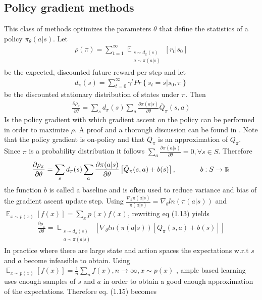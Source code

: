 \subsection{Policy gradient methods}

This class of methods optimizes the parameters $\theta$ that define the statistics of a policy $\pi_\theta(a|s)$. Let 
\begin{align}
\rho(\pi) = \sum_{t=1}^{\infty}\mathop{\mathbb{E}}_{\substack{s\sim d_\pi(s) \\ a\sim \pi(a|s)}} \left[ r_t|s_0 \right]
\end{align}
be the expected, discounted future reward per step and let
\begin{align}
d_\pi(s) = \sum_{t=0}^\infty \gamma^t Pr\left\{s_t=s|s_0, \pi\right\}
\end{align}
be the discounted stationary distribution of states under $\pi$. Then
\begin{align}
\frac{\partial\rho_\pi}{\partial\theta} = \sum_s d_\pi(s)\sum_a \frac{\partial\pi(a|s)}{\partial\theta} \bar{Q}_\pi(s,a)
\end{align}
Is the policy gradient with which gradient ascent on the policy can be performed in order to maximize $\rho$. A proof and a thorough discussion can be found in \cite{PGBS}. Note that the policy gradient is on-policy and that $\bar{Q}_\pi$ is an approximation of $Q_\pi$.\\
Since $\pi$ is a probability distribution it follows $\sum_a\frac{\partial\pi(a|s)}{\partial\theta}=0, \forall s \in S$. Therefore
\begin{align}
\frac{\partial\rho_\pi}{\partial\theta} = \sum_s d_\pi(s)\sum_a \frac{\partial\pi(a|s)}{\partial\theta}\left[ \bar{Q}_\pi(s,a)+b(s)\right],\text{\hspace{12mm}} b:S\rightarrow \mathop{\mathbb{R}}
\end{align}
the function $b$ is called a baseline and is often used to reduce variance and bias of the gradient ascent update step. Using $\frac{\nabla_\theta\pi(a|s)}{\pi(a|s)} = \nabla_\theta ln(\pi(a|s))$ and $\mathop{\mathbb{E}}_{x\sim p(x)}[f(x)] = \sum_{x}p(x)f(x)$, rewriting eq (1.13) yields
\begin{align}
\frac{\partial\rho_\pi}{\partial\theta} = \mathop{\mathbb{E}}_{\substack{s\sim d_\pi(s) \\ a\sim \pi(a|s)}}\left[ \nabla_\theta ln (\pi(a|s))\left[ \bar{Q}_\pi(s,a)+b(s)\right]\right]
\end{align}
In practice where there are large state and action spaces the expectations w.r.t $s$ and $a$ become infeasible to obtain. Using $\mathop{\mathbb{E}}_{x\sim p(x)}[f(x)] = \frac{1}{n}\sum_{n}f(x), n\rightarrow\infty, x\sim p(x)$ , ample based learning uses enough samples of $s$ and $a$ in order to obtain a good enough approximation of the expectations. Therefore eq. (1.15) becomes

